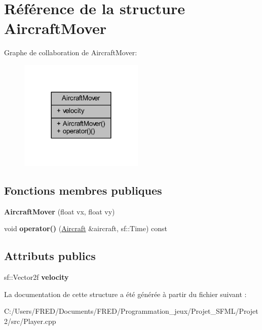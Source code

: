 \hypertarget{struct_aircraft_mover}{}\section{Référence de la structure Aircraft\+Mover}
\label{struct_aircraft_mover}


Graphe de collaboration de Aircraft\+Mover\+:\nopagebreak
\begin{figure}[H]
\begin{center}
\leavevmode
\includegraphics[width=168pt]{struct_aircraft_mover__coll__graph}
\end{center}
\end{figure}
\subsection*{Fonctions membres publiques}
\begin{DoxyCompactItemize}
\item 
{\bfseries Aircraft\+Mover} (float vx, float vy)\hypertarget{struct_aircraft_mover_a663cf13bc8568988fb45195efbea2a3b}{}\label{struct_aircraft_mover_a663cf13bc8568988fb45195efbea2a3b}

\item 
void {\bfseries operator()} (\hyperlink{class_aircraft}{Aircraft} \&aircraft, sf\+::\+Time) const \hypertarget{struct_aircraft_mover_a323a3dfc2bd9544018a98ce20baeea05}{}\label{struct_aircraft_mover_a323a3dfc2bd9544018a98ce20baeea05}

\end{DoxyCompactItemize}
\subsection*{Attributs publics}
\begin{DoxyCompactItemize}
\item 
sf\+::\+Vector2f {\bfseries velocity}\hypertarget{struct_aircraft_mover_a8403de0c4c7e057e7a47c6d38f621468}{}\label{struct_aircraft_mover_a8403de0c4c7e057e7a47c6d38f621468}

\end{DoxyCompactItemize}


La documentation de cette structure a été générée à partir du fichier suivant \+:\begin{DoxyCompactItemize}
\item 
C\+:/\+Users/\+F\+R\+E\+D/\+Documents/\+F\+R\+E\+D/\+Programmation\+\_\+jeux/\+Projet\+\_\+\+S\+F\+M\+L/\+Projet2/src/Player.\+cpp\end{DoxyCompactItemize}
